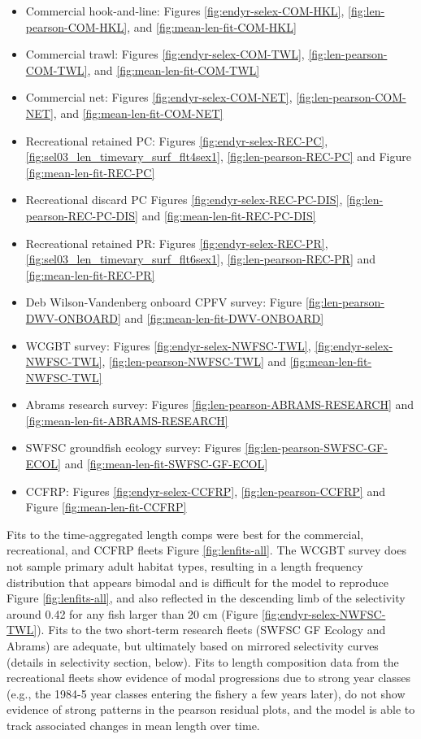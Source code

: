 \documentclass[
  english,
  a4paper,
]{article}
\providecommand{\tightlist}{%
  \setlength{\itemsep}{0pt}\setlength{\parskip}{0pt}}
\begin{document}
\begin{itemize}
\tightlist
\item
  Commercial hook-and-line: Figures \ref{fig:endyr-selex-COM-HKL}, \ref{fig:len-pearson-COM-HKL}, and \ref{fig:mean-len-fit-COM-HKL}
\item
  Commercial trawl: Figures \ref{fig:endyr-selex-COM-TWL}, \ref{fig:len-pearson-COM-TWL}, and \ref{fig:mean-len-fit-COM-TWL}
\item
  Commercial net: Figures \ref{fig:endyr-selex-COM-NET}, \ref{fig:len-pearson-COM-NET}, and \ref{fig:mean-len-fit-COM-NET}
\item
  Recreational retained PC: Figures \ref{fig:endyr-selex-REC-PC}, \ref{fig:sel03_len_timevary_surf_flt4sex1}, \ref{fig:len-pearson-REC-PC} and Figure \ref{fig:mean-len-fit-REC-PC}
\item
  Recreational discard PC Figures \ref{fig:endyr-selex-REC-PC-DIS}, \ref{fig:len-pearson-REC-PC-DIS} and \ref{fig:mean-len-fit-REC-PC-DIS}
\item
  Recreational retained PR: Figures \ref{fig:endyr-selex-REC-PR}, \ref{fig:sel03_len_timevary_surf_flt6sex1}, \ref{fig:len-pearson-REC-PR} and \ref{fig:mean-len-fit-REC-PR}\\
\item
  Deb Wilson-Vandenberg onboard CPFV survey: Figure \ref{fig:len-pearson-DWV-ONBOARD} and \ref{fig:mean-len-fit-DWV-ONBOARD}
\item
  WCGBT survey: Figures \ref{fig:endyr-selex-NWFSC-TWL}, \ref{fig:endyr-selex-NWFSC-TWL}, \ref{fig:len-pearson-NWFSC-TWL} and \ref{fig:mean-len-fit-NWFSC-TWL}
\item
  Abrams research survey: Figures \ref{fig:len-pearson-ABRAMS-RESEARCH} and \ref{fig:mean-len-fit-ABRAMS-RESEARCH}\\
\item
  SWFSC groundfish ecology survey: Figures \ref{fig:len-pearson-SWFSC-GF-ECOL} and \ref{fig:mean-len-fit-SWFSC-GF-ECOL}\\
\item
  CCFRP: Figures \ref{fig:endyr-selex-CCFRP}, \ref{fig:len-pearson-CCFRP} and Figure \ref{fig:mean-len-fit-CCFRP}
\end{itemize}

Fits to the time-aggregated length comps were best for the commercial, recreational, and CCFRP fleets Figure \ref{fig:lenfits-all}. The WCGBT survey does not sample primary adult habitat types, resulting in a length frequency distribution that appears bimodal and is difficult for the model to reproduce Figure \ref{fig:lenfits-all}, and also reflected in the descending limb of the selectivity around 0.42 for any fish larger than 20 cm (Figure \ref{fig:endyr-selex-NWFSC-TWL}). Fits to the two short-term research fleets (SWFSC GF Ecology and Abrams) are adequate, but ultimately based on mirrored selectivity curves (details in selectivity section, below). Fits to length composition data from the recreational fleets show evidence of modal progressions due to strong year classes (e.g., the 1984-5 year classes entering the fishery a few years later), do not show evidence of strong patterns in the pearson residual plots, and the model is able to track associated changes in mean length over time.
\end{document}
